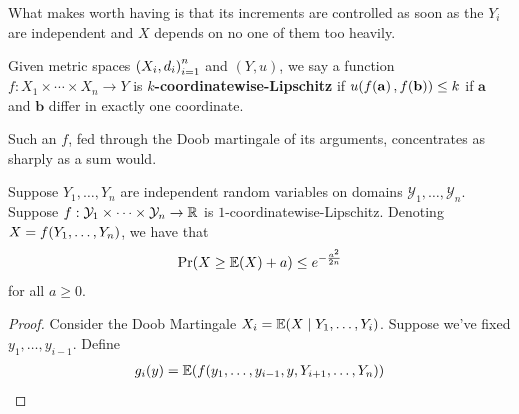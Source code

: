 What makes  worth having is that its increments are controlled as soon as the $Y_i$ are independent and $X$ depends on no one of them too heavily.

\begin{boxdefinition}
    Given metric spaces $\left( X_i, d_i \right)_{i=1}^{n}$ and $(Y, u)$, we say a function $f : X_1 \times \cdots \times X_n  \to Y$ is \textbf{$k$-coordinatewise-Lipschitz} if $u\!\left( f\!\left( \mathbf{a} \right), f\!\left( \mathbf{b} \right) \right) \leq k$ if $\mathbf{a}$ and $\mathbf{b}$ differ in exactly one coordinate.
\end{boxdefinition}

Such an $f$, fed through the Doob martingale of its arguments, concentrates as sharply as a sum would.

\begin{boxproposition} \label{Ch4:Prop:McDiarmid}
    Suppose $Y_1, \ldots, Y_n$ are independent random variables on domains $\mathcal{Y}_1, \ldots, \mathcal{Y}_n$. Suppose $f : \mathcal{Y}_1 \times \cdots \times \mathcal{Y}_n \to \mathbb{R}$ is $1$-coordinatewise-Lipschitz. Denoting $X = f\!\left( Y_1, \ldots, Y_n \right)$, we have that
    \begin{align*}
        \Pr\!\left( X \geq \mathbb{E}\!\left( X \right) + a \right) \leq e^{-\frac{a^2}{2n}}
    \end{align*}
    for all $a \geq 0$.
\end{boxproposition}
\begin{proof}
    Consider the Doob Martingale $X_i = \mathbb{E}\!\left( X \mid Y_1, \ldots, Y_i \right)$. Suppose we've fixed $y_1, \ldots, y_{i - 1}$. Define
    \begin{align*}
        g_i(y) = \mathbb{E}\!\left( f\!\left( y_1, \ldots, y_{i-1}, y, Y_{i+1}, \ldots, Y_n \right) \right)
    \end{align*}
    \sorry %
\end{proof}

